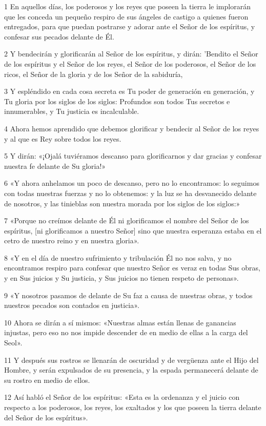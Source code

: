 \par 1 En aquellos días, los poderosos y los reyes que poseen la tierra le implorarán que les conceda un pequeño respiro de sus ángeles de castigo a quienes fueron entregados, para que puedan postrarse y adorar ante el Señor de los espíritus, y confesar sus pecados delante de Él.
\par 2 Y bendecirán y glorificarán al Señor de los espíritus, y dirán: 'Bendito el Señor de los espíritus y el Señor de los reyes, el Señor de los poderosos, el Señor de los ricos, el Señor de la gloria y de los Señor de la sabiduría,
\par 3 Y espléndido en cada cosa secreta es Tu poder de generación en generación, y Tu gloria por los siglos de los siglos: Profundos son todos Tus secretos e innumerables, y Tu justicia es incalculable.
\par 4 Ahora hemos aprendido que debemos glorificar y bendecir al Señor de los reyes y al que es Rey sobre todos los reyes.
\par 5 Y dirán: «¡Ojalá tuviéramos descanso para glorificarnos y dar gracias y confesar nuestra fe delante de Su gloria!»
\par 6 «Y ahora anhelamos un poco de descanso, pero no lo encontramos: lo seguimos con todas nuestras fuerzas y no lo obtenemos: y la luz se ha desvanecido delante de nosotros, y las tinieblas son nuestra morada por los siglos de los siglos:»
\par 7 «Porque no creímos delante de Él ni glorificamos el nombre del Señor de los espíritus, [ni glorificamos a nuestro Señor] sino que nuestra esperanza estaba en el cetro de nuestro reino y en nuestra gloria».
\par 8 «Y en el día de nuestro sufrimiento y tribulación Él no nos salva, y no encontramos respiro para confesar que nuestro Señor es veraz en todas Sus obras, y en Sus juicios y Su justicia, y Sus juicios no tienen respeto de personas».
\par 9 «Y nosotros pasamos de delante de Su faz a causa de nuestras obras, y todos nuestros pecados son contados en justicia».
\par 10 Ahora se dirán a sí mismos: «Nuestras almas están llenas de ganancias injustas, pero eso no nos impide descender de en medio de ellas a la carga del Seol».
\par 11 Y después sus rostros se llenarán de oscuridad y de vergüenza ante el Hijo del Hombre, y serán expulsados ​​de su presencia, y la espada permanecerá delante de su rostro en medio de ellos.
\par 12 Así habló el Señor de los espíritus: «Esta es la ordenanza y el juicio con respecto a los poderosos, los reyes, los exaltados y los que poseen la tierra delante del Señor de los espíritus».

